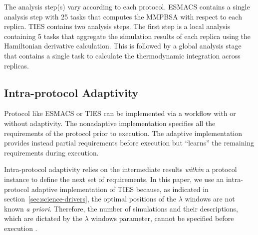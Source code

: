 The analysis step(s) vary according to each protocol. ESMACS contains a
single analysis step with 25 tasks that computes the MMPBSA with respect to
each replica. TIES contains
two analysis steps. The first step is a local analysis containing 5 tasks
that aggregate the simulation results of each replica using the Hamiltonian
derivative calculation. This is followed by a global analysis stage that
contains a single task to calculate the thermodynamic integration across
replicas.


\subsection{Intra-protocol Adaptivity} 




Protocol like ESMACS or TIES can be implemented via a workflow with or
without adaptivity. The nonadaptive implementation specifies all the
requirements of the protocol prior to execution. The adaptive implementation
provides instead partial requirements before execution but ``learns'' the
remaining requirements during execution.

Intra-protocol adaptivity relies on the intermediate results \textit{within}
a protocol instance to define the next set of requirements. In this paper, we
use an intra-protocol adaptive implementation of TIES because, as indicated
in section~\ref{sec:science-drivers}, the optimal positions of the $\lambda$
windows are not known \textit{a priori}. Therefore, the number of simulations
and their descriptions, which are dictated by the $\lambda$ windows
parameter, cannot be specified before execution .

